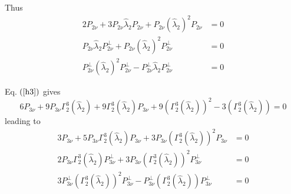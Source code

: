 \documentclass[aps,preprint]{revtex4}%
\begin{document}
Thus
\begin{align}
2P_{2\nu}+3P_{2\nu}\hat{\lambda}_{2}P_{2\nu}+P_{2\nu}\left(  \hat{\lambda}%
_{2}\right)  ^{2}P_{2\nu}  &  =0\\
P_{2\nu}\hat{\lambda}_{2}P_{2\nu}^{\bot}+P_{2\nu}\left(  \hat{\lambda}%
_{2}\right)  ^{2}P_{2\nu}^{\bot}  &  =0\\
P_{2\nu}^{\bot}\left(  \hat{\lambda}_{2}\right)  ^{2}P_{2\nu}^{\bot}-P_{2\nu
}^{\bot}\hat{\lambda}_{2}P_{2\nu}^{\bot}  &  =0
\end{align}


Eq. $\left(  \ref{h3}\right)  $ gives
\begin{equation}
6P_{3\nu}+9P_{3\nu}\Gamma_{2}^{3}\left(  \hat{\lambda}_{2}\right)
+9\Gamma_{2}^{3}\left(  \hat{\lambda}_{2}\right)  P_{3\nu}+9\left(  \Gamma
_{2}^{3}\left(  \hat{\lambda}_{2}\right)  \right)  ^{2}-3\left(  \Gamma
_{2}^{3}\left(  \hat{\lambda}_{2}\right)  \right)  =0
\end{equation}
leading to
\begin{align}
3P_{3\nu}+5P_{3\nu}\Gamma_{2}^{3}\left(  \hat{\lambda}_{2}\right)  P_{3\nu
}+3P_{3\nu}\left(  \Gamma_{2}^{3}\left(  \hat{\lambda}_{2}\right)  \right)
^{2}P_{3\nu}  &  =0\\
2P_{3\nu}\Gamma_{2}^{3}\left(  \hat{\lambda}_{2}\right)  P_{3\nu}^{\bot
}+3P_{3\nu}\left(  \Gamma_{2}^{3}\left(  \hat{\lambda}_{2}\right)  \right)
^{2}P_{3\nu}^{\bot}  &  =0\\
3P_{3\nu}^{\bot}\left(  \Gamma_{2}^{3}\left(  \hat{\lambda}_{2}\right)
\right)  ^{2}P_{3\nu}^{\bot}-P_{3\nu}^{\bot}\left(  \Gamma_{2}^{3}\left(
\hat{\lambda}_{2}\right)  \right)  P_{3\nu}^{\bot}  &  =0
\end{align}
\end{document}

